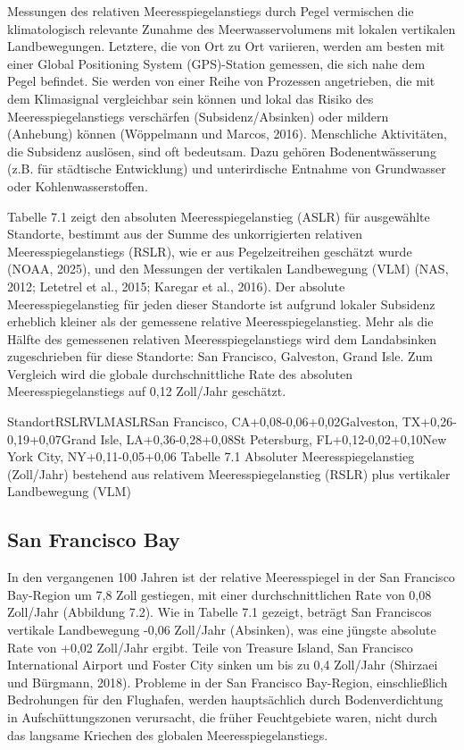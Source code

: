 \documentclass[12pt,paper=a4,DIV=12,parskip=never,chapterprefix=false,headings=standardclasses]{scrreprt}
\begin{document}
Messungen des relativen Meeresspiegelanstiegs durch Pegel vermischen die klimatologisch relevante Zunahme des Meerwasservolumens mit lokalen vertikalen Landbewegungen. Letztere, die von Ort zu Ort variieren, werden am besten mit einer Global Positioning System (GPS)-Station gemessen, die sich nahe dem Pegel befindet. Sie werden von einer Reihe von Prozessen angetrieben, die mit dem Klimasignal vergleichbar sein können und lokal das Risiko des Meeresspiegelanstiegs verschärfen (Subsidenz/Absinken) oder mildern (Anhebung) können (Wöppelmann und Marcos, 2016). Menschliche Aktivitäten, die Subsidenz auslösen, sind oft bedeutsam. Dazu gehören Bodenentwässerung (z.B. für städtische Entwicklung) und unterirdische Entnahme von Grundwasser oder Kohlenwasserstoffen.

Tabelle 7.1 zeigt den absoluten Meeresspiegelanstieg (ASLR) für ausgewählte Standorte, bestimmt aus der Summe des unkorrigierten relativen Meeresspiegelanstiegs (RSLR), wie er aus Pegelzeitreihen geschätzt wurde (NOAA, 2025), und den Messungen der vertikalen Landbewegung (VLM) (NAS, 2012; Letetrel et al., 2015; Karegar et al., 2016). Der absolute Meeresspiegelanstieg für jeden dieser Standorte ist aufgrund lokaler Subsidenz erheblich kleiner als der gemessene relative Meeresspiegelanstieg. Mehr als die Hälfte des gemessenen relativen Meeresspiegelanstiegs wird dem Landabsinken zugeschrieben für diese Standorte: San Francisco, Galveston, Grand Isle. Zum Vergleich wird die globale durchschnittliche Rate des absoluten Meeresspiegelanstiegs auf 0,12 Zoll/Jahr geschätzt.


StandortRSLRVLMASLRSan Francisco, CA+0,08-0,06+0,02Galveston, TX+0,26-0,19+0,07Grand Isle, LA+0,36-0,28+0,08St Petersburg, FL+0,12-0,02+0,10New York City, NY+0,11-0,05+0,06
Tabelle 7.1 Absoluter Meeresspiegelanstieg (Zoll/Jahr) bestehend aus relativem Meeresspiegelanstieg (RSLR) plus vertikaler Landbewegung (VLM)


\subsection{San Francisco Bay}
In den vergangenen 100 Jahren ist der relative Meeresspiegel in der San Francisco Bay-Region um 7,8 Zoll gestiegen, mit einer durchschnittlichen Rate von 0,08 Zoll/Jahr (Abbildung 7.2). Wie in Tabelle 7.1 gezeigt, beträgt San Franciscos vertikale Landbewegung -0,06 Zoll/Jahr (Absinken), was eine jüngste absolute Rate von +0,02 Zoll/Jahr ergibt. Teile von Treasure Island, San Francisco International Airport und Foster City sinken um bis zu 0,4 Zoll/Jahr (Shirzaei und Bürgmann, 2018). Probleme in der San Francisco Bay-Region, einschließlich Bedrohungen für den Flughafen, werden hauptsächlich durch Bodenverdichtung in Aufschüttungszonen verursacht, die früher Feuchtgebiete waren, nicht durch das langsame Kriechen des globalen Meeresspiegelanstiegs.
\end{document}
